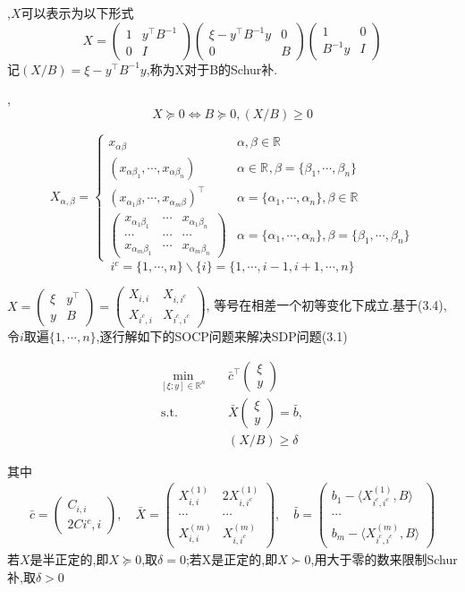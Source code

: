 \documentclass[UTF8]{ctexart}
\newcommand{\s}{\quad}
\renewcommand{\b}{\textbf}
\newcommand{\p}{\paragraph{}\s}
\newcommand{\equSplit}[1]{\begin{equation}\begin{split}#1\end{split}\end{equation}}
\newcommand{\equ}[1]{\begin{equation}#1\end{equation}}
\newcommand{\Tst}{\text{s.t.}\s}
\newcommand{\inprod}[1]{\langle#1\rangle}
\newcommand{\Real}[1]{\mathbb{R}^{#1}}
\newcommand{\pMa}[1]{\begin{pmatrix}#1\end{pmatrix}}
\numberwithin{equation}{section}
\begin{document}
		,$X$可以表示为以下形式
		\equ{
			X=\pMa{1&y^\top B^{-1}\\0&I}\pMa{\xi-y^\top B^{-1}y&0\\0&B}\pMa{1&0\\B^{-1}y&I}
		}
		记$(X/B)=\xi-y^\top B^{-1}y$,称为X对于B的Schur补.

		,\equ{X\succeq0\Leftrightarrow B\succeq0,(X/B)\geq0}

		\equ{
			X_{\alpha,\beta}=
			\begin{cases}
				x_{\alpha\beta}
				&\alpha,\beta\in\Real{}\\
				(x_{\alpha\beta_1},\cdots,x_{\alpha\beta_n})
				&\alpha\in\Real{},\beta=\{\beta_1,\cdots,\beta_n\}\\
				(x_{\alpha_1\beta},\cdots,x_{\alpha_m\beta})^\top
				&\alpha=\{\alpha_1,\cdots,\alpha_n\},\beta\in\Real{}\\
				\pMa{
				x_{\alpha_1\beta_1} & \cdots & x_{\alpha_1\beta_n} \\
				\cdots              & \cdots & \cdots              \\
				x_{\alpha_m\beta_1} & \cdots & x_{\alpha_m\beta_n}
				}
				&\alpha=\{\alpha_1,\cdots,\alpha_n\},\beta=\{\beta_1,\cdots,\beta_n\}
			\end{cases}
		}
		\equ{i^c=\{1,\cdots,n\}\backslash\{i\}=\{1,\cdots,i-1,i+1,\cdots,n\}}

		$X=\pMa{\xi&y^\top\\ y&B}=\pMa{X_{i,i}&X_{i,i^c}\\X_{i^c,i}&X_{i^c,i^c}}$,
		等号在相差一个初等变化下成立.基于(3.4),
		令$i$取遍$\{1,\cdots,n\}$,逐行解如下的SOCP问题来解决SDP问题(3.1)

		\equSplit{
			\min_{[\xi;y]\in\Real{n}}\s&\bar{c}^\top\pMa{\xi\\y}\\
			\Tst&\bar{X}\pMa{\xi\\y}=\bar{b},\\
			&(X/B)\geq\delta
		}

		其中
		\equSplit{
			\bar{c}=\pMa{C_{i,i}\\2C{i^c,i}},\s
			\bar{X}=\pMa{X^(1)_{i,i}&2X^(1)_{i,i^c}\\\cdots&\cdots\\X^(m)_{i,i}&X^(m)_{i,i^c}},\s
			\bar{b}=\pMa{b_1-\inprod{X^(1)_{i^c,i^c},B}\\\cdots\\b_m-\inprod{X^(m)_{i^c,i^c},B}}
		}
		若$X$是半正定的,即$X\succeq0$,取$\delta=0$;若X是正定的,即$X\succ0$,用大于零的数来限制Schur补,取$\delta>0$
\end{document}
